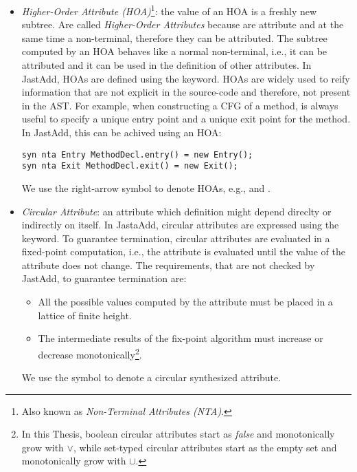 \begin{itemize}
    \item \emph{Higher-Order Attribute (HOA)}\footnote{Also known as \emph{Non-Terminal Attributes (NTA)}.}:
    the value of an HOA is a freshly new subtree. Are called \emph{Higher-Order Attributes}
    because are attribute and at the same time a non-terminal, therefore they can be attributed.
    The subtree computed by an HOA behaves like a normal non-terminal, i.e., it can be
    attributed and it can be used in the definition of other attributes. In JastAdd, HOAs
    are defined using the  keyword. HOAs are widely used to reify information 
    that are not explicit in the source-code and therefore, not present in the AST.
    For example, when constructing a CFG of a method, is always useful to specify
    a unique entry point and a unique exit point for the method. In JastAdd, this can be
    achived using an HOA:
    \begin{lstlisting}[language=JastAdd]
syn nta Entry MethodDecl.entry() = new Entry();
syn nta Exit MethodDecl.exit() = new Exit();
    \end{lstlisting}
    We use the right-arrow symbol to denote HOAs, e.g.,   and .
    \item \emph{Circular Attribute}: an attribute which definition might depend direclty
    or indirectly on itself. In JastaAdd, circular attributes are expressed using the 
    keyword. To guarantee termination, circular attributes are evaluated in a fixed-point
    computation, i.e., the attribute is evaluated until the value of the attribute does not change.
    The requirements, that are not checked by JastAdd, to guarantee termination are:
    \begin{itemize}
        \item All the possible values computed by the attribute must be placed 
        in a lattice of finite height.
        \item The intermediate results of the fix-point algorithm must increase 
        or decrease monotonically\footnote{In this Thesis, boolean circular attributes start
        as \emph{false} and monotonically grow with $\vee$, while set-typed circular attributes
        start as the empty set and monotonically grow with $\cup$.}. 
    \end{itemize}
    We use the symbol  to denote a circular synthesized attribute.


\end{itemize}
